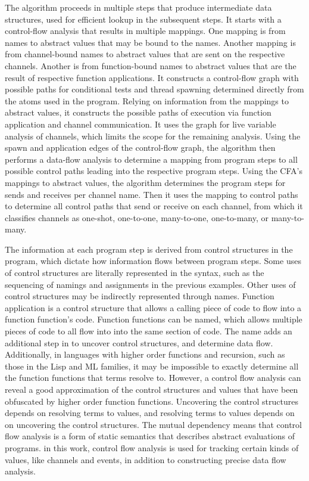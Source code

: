 \documentclass[letterpaper, 11pt]{extarticle}
\begin{document}
The algorithm proceeds in multiple steps that produce intermediate data structures, used for
efficient lookup in the subsequent steps.  It starts with a control-flow analysis that
results in multiple mappings. One mapping is from names to abstract values that may be bound to
the names. Another mapping is from channel-bound names to abstract values that are
sent on the respective channels. Another is from function-bound names to abstract values
that are the result of respective function applications.  It constructs a control-flow graph 
with possible paths for conditional tests and thread spawning determined directly from the
atoms used in the program.  Relying on information from the mappings to abstract values,
it constructs the possible paths of execution via function application and channel
communication.  It uses the graph for live variable analysis of channels, which limits the
scope for the remaining analysis.  Using the spawn and application edges of the control-flow
graph, the algorithm then performs a data-flow analysis to determine a mapping from program
steps to all possible control paths leading into the respective program steps.  Using the
CFA's mappings to abstract values, the algorithm determines the program steps for sends and
receives per channel name.  Then it uses the mapping to control paths to determine all
control paths that send or receive on each channel, from which it classifies channels as
one-shot, one-to-one, many-to-one, one-to-many, or many-to-many.

The information at each program step is derived from control structures in the program, which
dictate how information flows between program steps. Some uses of control structures are
literally represented in the syntax, such as the sequencing of namings and assignments in the
previous examples. Other uses of control structures may be indirectly represented through
names. Function application is a control structure that allows a calling piece of code to
flow into a function function's code.  Function functions can be named, which allows
multiple pieces of code to all flow into into the same section of code. The name adds an
additional step in to uncover control structures, and determine data flow.
Additionally, in languages with higher order functions and recursion, such as those in the Lisp
and ML families, it may be impossible to exactly determine all the function functions that
terms resolve to. However, a control flow analysis can reveal a good
approximation of the control structures and values that have been obfuscated by higher order
function functions.  Uncovering the control structures depends on resolving terms
to values, and resolving terms to values depends on on uncovering the control
structures. The mutual dependency means that control flow analysis is a form of
static semantics that describes abstract evaluations of programs. in this work, control flow
analysis is used for tracking certain kinds of values, like channels and events, in addition to
constructing precise data flow analysis. 
\end{document}
